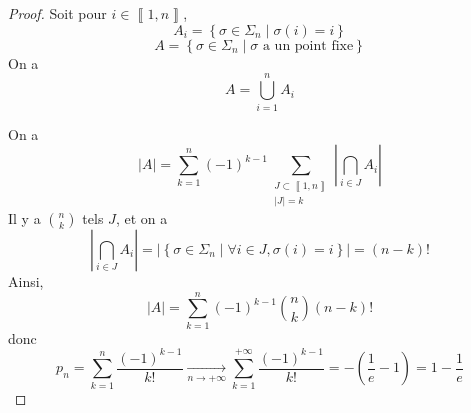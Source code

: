 \begin{proof}
    Soit pour $i\in\left\llbracket 1,n\right\rrbracket$, 
    \begin{equation}
        A_{i}=\left\{\sigma\in\Sigma_{n}\middle|\sigma(i)=i\right\}
    \end{equation}
    \begin{equation}
        A=\left\{\sigma\in\Sigma_{n}\middle|\sigma\text{ a un point fixe}\right\}
    \end{equation}
    On a 
    \begin{equation}
        A=\bigcup_{i=1}^{n}A_{i}
    \end{equation}

    On a 
    \begin{equation}
        \left\lvert A\right\rvert=\sum_{k=1}^{n}(-1)^{k-1}\sum_{\substack{J\subset\left\llbracket 1,n\right\rrbracket\\\left\lvert J\right\rvert=k}}\left\lvert\bigcap_{i\in J}A_{i}\right\rvert
    \end{equation}
    Il y a $\binom{n}{k}$ tels $J$, et on a 
    \begin{equation}
        \left\lvert\bigcap_{i\in J}A_{i}\right\rvert=\left\lvert\left\{\sigma\in\Sigma_{n}\middle|\forall i\in J,\sigma(i)=i\right\}\right\rvert=(n-k)!
    \end{equation}
    Ainsi, 
    \begin{equation}
        \left\lvert A\right\rvert=\sum_{k=1}^{n}(-1)^{k-1}\binom{n}{k}(n-k)!
    \end{equation}
    donc 
    \begin{equation}
        \boxed{p_{n}=\sum_{k=1}^{n}\frac{(-1)^{k-1}}{k!}\xrightarrow[n\to+\infty]{}\sum_{k=1}^{+\infty}\frac{(-1)^{k-1}}{k!}=-\left(\frac{1}{e}-1\right)=1-\frac{1}{e}}
    \end{equation}
\end{proof}

